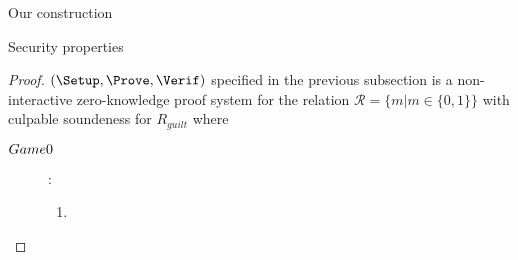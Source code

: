 \begin{section}{Our construction}
\begin{subsection}{Security properties}
    \begin{proof}
      $(\Setup, \Prove, \Verif)$ specified in the previous subsection is a non-interactive zero-knowledge proof system for the relation $\mathcal{R} = \{ m | m \in \{0,1\}\}$ with culpable soundeness for $R_{guilt}$ where
      \begin{lemma}
    	\begin{description}
    	\item[$\boldmath{Game 0}$] :
    	  \begin{enumerate}
    	  \item 
    	  \end{enumerate}
    	\end{description}
      \end{lemma}
    \end{proof}
  \end{subsection}


\end{section}
